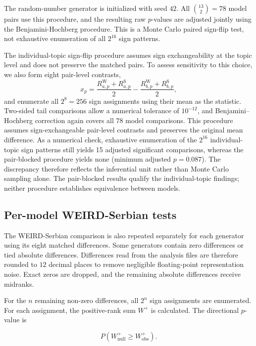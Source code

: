 \documentclass[11pt,a4paper]{article}
\begin{document}
The random-number generator is initialized with seed $42$. All $\binom{13}{2}=78$ model pairs use this procedure, and the resulting raw $p$-values are adjusted jointly using the Benjamini-Hochberg procedure. This is a Monte Carlo paired sign-flip test, not exhaustive enumeration of all $2^{16}$ sign patterns.

The individual-topic sign-flip procedure assumes sign exchangeability at the topic level and does not preserve the matched pairs. To assess sensitivity to this choice, we also form eight pair-level contrasts,
\[
x_p=\frac{R_{a,p}^{\mathrm W}+R_{a,p}^{\mathrm S}}{2}
    -\frac{R_{b,p}^{\mathrm W}+R_{b,p}^{\mathrm S}}{2},
\]
and enumerate all $2^8=256$ sign assignments using their mean as the statistic. Two-sided tail comparisons allow a numerical tolerance of $10^{-12}$, and Benjamini--Hochberg correction again covers all $78$ model comparisons. This procedure assumes sign-exchangeable pair-level contrasts and preserves the original mean difference. As a numerical check, exhaustive enumeration of the $2^{16}$ individual-topic sign patterns still yields 15 adjusted significant comparisons, whereas the pair-blocked procedure yields none (minimum adjusted $p=0.087$). The discrepancy therefore reflects the inferential unit rather than Monte Carlo sampling alone. The pair-blocked results qualify the individual-topic findings; neither procedure establishes equivalence between models.

\subsection{Per-model WEIRD-Serbian tests}
\label{app:per_model_tests}

The WEIRD-Serbian comparison is also repeated separately for each generator using its eight matched differences. Some generators contain zero differences or tied absolute differences. Differences read from the analysis files are therefore rounded to $12$ decimal places to remove negligible floating-point representation noise. Exact zeros are dropped, and the remaining absolute differences receive midranks.

For the $n$ remaining non-zero differences, all $2^n$ sign assignments are enumerated. For each assignment, the positive-rank sum $W^+$ is calculated. The directional $p$-value is

\begin{equation}
 P\left(W^+_{\mathrm{null}}\geq W^+_{\mathrm{obs}}\right).
\end{equation}
\end{document}
